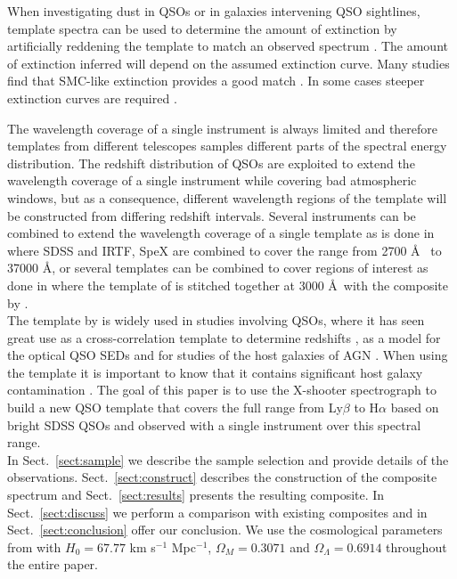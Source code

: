 \documentclass{aa}    %
\newcommand{\sectionname}{Sect.}
\newcommand{\Sect}[1]{\sectionname~\ref{sect:#1}}
\newcommand{\sect}[1]{\Sect{#1}}
\begin{document}
When investigating dust in QSOs or in galaxies intervening QSO sightlines, template spectra can be used to determine the
amount of extinction by artificially reddening the template 
to match an observed spectrum \citep[e.g.,][]{Glikman2007,Urrutia2009,Wang2012,Fynbo2013,Krogager2015}. 
The amount of extinction inferred will depend on the
assumed extinction curve. Many studies find that SMC-like extinction provides
a good match \citep{Richards2003,Hopkins2004}. In some cases steeper extinction
curves are required \citep{Fynbo2013,Jiang2013,Leighly2014}.

The wavelength coverage of a single instrument is always limited and therefore
templates from different telescopes samples different parts of the spectral energy distribution. The redshift
distribution of QSOs are exploited to extend the wavelength coverage of a
single instrument while covering bad atmospheric windows, but as a consequence, different wavelength regions of the template will be constructed from differing
redshift intervals. Several instruments can be combined to extend the wavelength
coverage of a single template as is done in \citet{Glikman2006} where SDSS \citep{Gunn2006} and IRTF, SpeX \citep{Rayner2003} are combined to
cover the range from 2700 \AA~ to 37000 \AA, or several templates can be
combined to cover regions of interest as done in \citet{Zhou2010} where the
template of \citet{VandenBerk2001} is stitched together at 3000
\AA~with the composite by \citet{Glikman2006}. \\
The template by \citet{VandenBerk2001} is widely
used in studies involving QSOs, where it has seen great use as a
cross-correlation template to determine redshifts \citep{Stoughton2002, Rafiee2011}, as a model for the optical QSO SEDs \citep{Croom2004, Hopkins2006, Hopkins2007} and for studies of the host galaxies of AGN \citep{Kauffmann2003b}. When using the \citet{VandenBerk2001} template
it is important to know that it contains significant host galaxy contamination
\citep[e.g.,][their Fig.~5]{Fynbo2013}. The goal of this paper is to use the X-shooter spectrograph to build a new QSO template that covers the full range from Ly$\beta$ to H$\alpha$ based on bright
SDSS QSOs and observed with a single instrument over this spectral range. \\
In \sect{sample} we describe the sample selection and provide details 
of the observations. \sect{construct} describes the construction of the composite spectrum
and \sect{results} presents the resulting composite. In \sect{discuss} we perform a comparison with existing composites and in \sect{conclusion} offer our conclusion. We use the cosmological parameters from \citet{Planck2014} with $H_{0} = 67.77$ km s$^{-1}$ Mpc$^{-1}$, $\Omega_{M} = 0.3071$ and $\Omega_{\Lambda} = 0.6914$ throughout the entire paper. 
\end{document}
